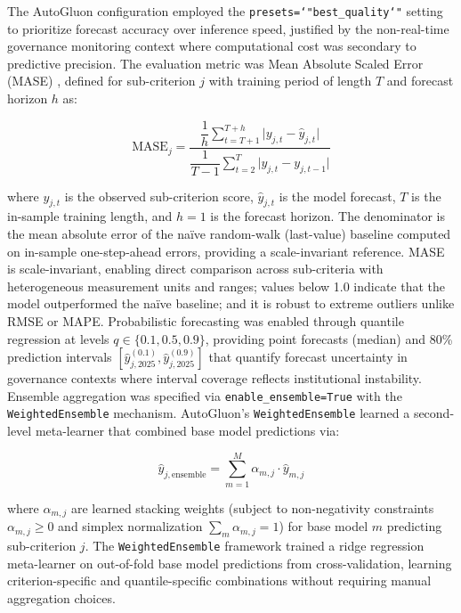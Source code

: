 \documentclass[12pt,a4paper]{article}
\begin{document}
The AutoGluon configuration employed the \texttt{presets=\char`"best\_quality\char`"} setting to prioritize forecast accuracy over inference speed, justified by the non-real-time governance monitoring context where computational cost was secondary to predictive precision. The evaluation metric was Mean Absolute Scaled Error (MASE) \citep{Hyndman2006}, defined for sub-criterion $j$ with training period of length $T$ and forecast horizon $h$ as:

\begin{equation}
\label{eq:mase}
\text{MASE}_j
  = \frac{\dfrac{1}{h}\displaystyle\sum_{t=T+1}^{T+h} \bigl|y_{j,t} - \hat{y}_{j,t}\bigr|}
         {\dfrac{1}{T-1}\displaystyle\sum_{t=2}^{T} \bigl|y_{j,t} - y_{j,t-1}\bigr|}
\end{equation}

where $y_{j,t}$ is the observed sub-criterion score, $\hat{y}_{j,t}$ is the model forecast, $T$ is the in-sample training length, and $h = 1$ is the forecast horizon. The denominator is the mean absolute error of the na\"ive random-walk (last-value) baseline computed on in-sample one-step-ahead errors, providing a scale-invariant reference. MASE is scale-invariant, enabling direct comparison across sub-criteria with heterogeneous measurement units and ranges; values below 1.0 indicate that the model outperformed the na\"ive baseline; and it is robust to extreme outliers unlike RMSE or MAPE. Probabilistic forecasting was enabled through quantile regression at levels $q \in \{0.1, 0.5, 0.9\}$, providing point forecasts (median) and 80\% prediction intervals $[\hat{y}_{j,2025}^{(0.1)}, \hat{y}_{j,2025}^{(0.9)}]$ that quantify forecast uncertainty in governance contexts where interval coverage reflects institutional instability. Ensemble aggregation was specified via \texttt{enable\_ensemble=True} with the \texttt{WeightedEnsemble} mechanism. AutoGluon's \texttt{WeightedEnsemble} learned a second-level meta-learner that combined base model predictions via:

\begin{equation}
\label{eq:weighted_ensemble}
\hat{y}_{j,\text{ensemble}} = \sum_{m=1}^{M} \alpha_{m,j} \cdot \hat{y}_{m,j}
\end{equation}

where $\alpha_{m,j}$ are learned stacking weights (subject to non-negativity constraints $\alpha_{m,j} \geq 0$ and simplex normalization $\sum_m \alpha_{m,j} = 1$) for base model $m$ predicting sub-criterion $j$. The \texttt{WeightedEnsemble} framework trained a ridge regression meta-learner on out-of-fold base model predictions from cross-validation, learning criterion-specific and quantile-specific combinations without requiring manual aggregation choices.
\end{document}
